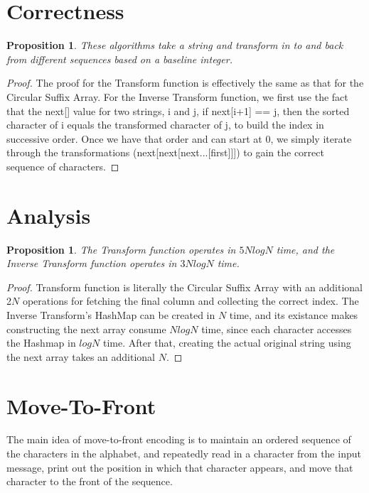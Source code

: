 \documentclass[12pt]{article}
\newtheorem{proposition}[theorem]{Proposition}
\begin{document}
\section{Correctness}

\begin{proposition}
These algorithms take a string and transform in to and back from different sequences based on a baseline integer.
\end{proposition}

\begin{proof}
The proof for the Transform function is effectively the same as that for the Circular Suffix Array. For the Inverse Transform function, we first use the fact that the next[] value for two strings, i and j, if next[i+1] == j, then the sorted character of i equals the transformed character of j, to build the index in successive order. Once we have that order and can start at 0, we simply iterate through the transformations (next[next[next...[first]]]) to gain the correct sequence of characters.
\end{proof}

\section{Analysis}

\begin{proposition}
\label{numq}
The Transform function operates in $5NlogN$ time, and the Inverse Transform function operates in $3NlogN$ time.
\end{proposition}

\begin{proof}
Transform function is literally the Circular Suffix Array with an additional 2$N$ operations for fetching the final column and collecting the correct index. The Inverse Transform's HashMap can be created in $N$ time, and its existance makes constructing the next array consume $NlogN$ time, since each character accesses the Hashmap in $logN$ time. After that, creating the actual original string using the next array takes an additional $N$.
\end{proof}


\section{Move-To-Front}
 The main idea of move-to-front encoding is to maintain an ordered sequence of the characters in the alphabet, and repeatedly read in a character from the input message, print out the position in which that character appears, and move that character to the front of the sequence.
 
\end{document}
